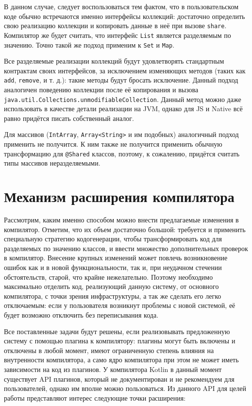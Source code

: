\documentclass[specification,annotation,times]{itmo-student-thesis}
\begin{document}
В данном случае, следует воспользоваться тем фактом, что в пользовательском коде обычно встречаются именно интерфейсы коллекций: достаточно определить свою реализацию коллекции и копировать данные в неё при вызове \texttt{share}.
Компилятор же будет считать, что интерфейс \texttt{List} является разделяемым по значению.
Точно такой же подход применим к \texttt{Set} и \texttt{Map}.

Все разделяемые реализации коллекций будут удовлетворять стандартным контрактам своих интерфейсов, за исключением изменяющих методов (таких как \texttt{add}, \texttt{remove}, и т. д.): такие методы будут бросать исключение.
Данный подход аналогичен поведению коллекции после её копирования и вызова \texttt{java.util.Collections.unmodifiableCollection}. Данный метод можно даже использовать в качестве детали реализации на JVM, однако для JS и Native всё равно придётся писать собственный аналог.

Для массивов (\texttt{IntArray}, \texttt{Array<String>} и им подобных) аналогичный подход применить не получится.
К ним также не получится применить обычную трансформацию для \texttt{@Shared} классов, поэтому, к сожалению, придётся считать типы массивов неразделяемыми.


\section{Механизм расширения компилятора}\label{codegen}

Рассмотрим, каким именно способом можно внести предлагаемые изменения в компилятор. Отметим, что их объем достаточно большой: требуется и применить специальную стратегию кодогенерации, чтобы трансформировать код для разделяемых по значению классов, и ввести множество дополнительных проверок в компилятор.
Внесение крупных изменений может повлечь возникновение ошибок как и в новой функциональности, так и, при неудачном стечении обстоятельств, старой, что крайне нежелательно.
Поэтому необходимо максимально отделить код, реализующий данную систему, от основного компилятора, с точки зрения инфраструктуры, а так же сделать его легко отключаемым: если у пользователя возникнут проблемы с новой системой, её будет возможно отключить без переписывания кода.

Все поставленные задачи будут решены, если реализовывать предложенную систему с помощью плагина к компилятору: плагины могут быть включены и отключены в любой момент, имеют ограниченную степень влияния на внутренности компилятора, а само ядро компилятора при этом не может иметь зависимости на код из плагинов.
У компилятора Kotlin в данный момент существует API плагинов, который не документирован и не рекомендуем для пользователей, однако им вполне можно пользоваться. Из данного API для целей работы представляют интерес следующие точки расширения:
\end{document}
